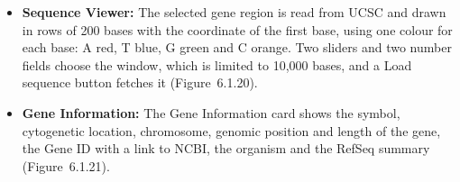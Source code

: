 \begin{itemize}
\item \textbf{Sequence Viewer:} The selected gene region is read from UCSC and drawn in rows of 200 bases with the coordinate of the first base, using one colour for each base: A red, T blue, G green and C orange. Two sliders and two number fields choose the window, which is limited to 10,000 bases, and a Load sequence button fetches it (Figure~6.1.20).
\item \textbf{Gene Information:} The Gene Information card shows the symbol, cytogenetic location, chromosome, genomic position and length of the gene, the Gene ID with a link to NCBI, the organism and the RefSeq summary (Figure~6.1.21).
\end{itemize}

